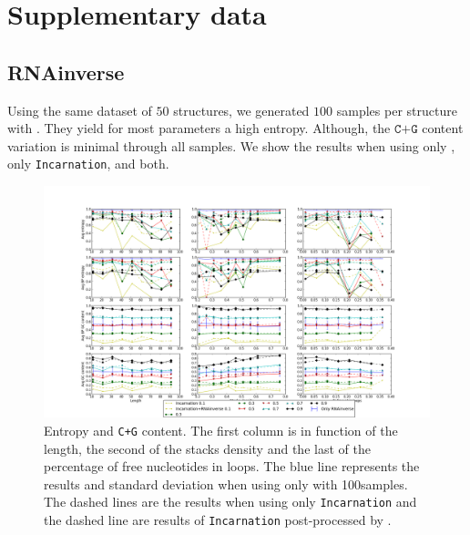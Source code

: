 \section{Supplementary data}
\subsection{RNAinverse}
Using the same dataset of $50$ structures, we generated $100$ samples
per structure with \RNAinverse. They yield for most parameters
a high entropy. Although, the $\texttt{C+G}$ content variation is minimal
through all samples. We show the results when using only \RNAinverse, 
only \texttt{Incarnation}, and both.


\begin{figure}[ht!]
	\centering
	\includegraphics[scale=0.4]{Figures/RNAinverse_data_100.png}
	\caption{Entropy and \texttt{C+G} content. The first
		column is in function of the length, the second of the stacks
		density and the last of the percentage of free nucleotides in loops.
		The blue line represents the results and standard deviation when using 
		only \RNAinverse with 100samples.  The dashed lines are the results
		when using only \texttt{Incarnation} and the dashed line are results
		of \texttt{Incarnation} post-processed by \RNAinverse.
		}
	\label{fig:rnainverse}
\end{figure}